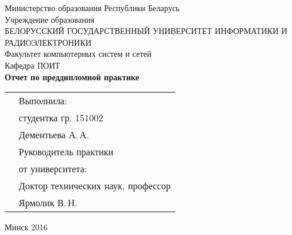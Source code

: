 \begin{titlepage}

    \begin{center}
        Министерство образования Республики Беларусь \\[0.4cm]

        Учреждение образования \\

        \MakeUppercase{БЕЛОРУССКИЙ ГОСУДАРСТВЕННЫЙ УНИВЕРСИТЕТ ИНФОРМАТИКИ И РАДИОЭЛЕКТРОНИКИ} \\[0.4cm]

        Факультет компьютерных систем и сетей \\[0.4cm]

        Кафедра ПОИТ \\[3.4cm] %

        {\large\bfseries{Отчет по преддипломной практике}} \\[2cm]

        \noindent
        \begin{tabular}{p{}p{}}
            & Выполнила: \\
            & студентка гр. 151002 \\
            & Дементьева А.\,А. \\[1cm]

            & Руководитель практики \\
            & от университета: \\
            & Доктор технических наук, профессор \\
            & Ярмолик В.\,Н. \\
        \end{tabular}

        \vfill

        {\normalsize Минск 2016}
    \end{center}

\end{titlepage}
